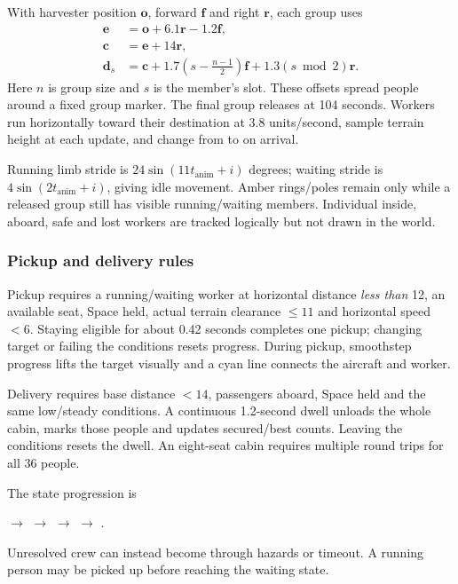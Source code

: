 With harvester position $\mathbf o$, forward $\mathbf f$ and right $\mathbf r$, each group uses
\begin{align}
\mathbf e&=\mathbf o+6.1\mathbf r-1.2\mathbf f,\\
\mathbf c&=\mathbf e+14\mathbf r,\\
\mathbf d_s&=\mathbf c+1.7\left(s-\frac{n-1}{2}\right)\mathbf f+1.3(s\bmod2)\mathbf r.
\end{align}
Here $n$ is group size and $s$ is the member's slot. These offsets spread people around a fixed group marker. The final group releases at 104 seconds. Workers run horizontally toward their destination at 3.8 units/second, sample terrain height at each update, and change from  to  on arrival.

Running limb stride is $24\sin(11t_{\mathrm{anim}}+i)$ degrees; waiting stride is $4\sin(2t_{\mathrm{anim}}+i)$, giving idle movement. Amber rings/poles remain only while a released group still has visible running/waiting members. Individual inside, aboard, safe and lost workers are tracked logically but not drawn in the world.

\subsubsection{Pickup and delivery rules}
Pickup requires a running/waiting worker at horizontal distance \emph{less than} 12, an available seat, Space held, actual terrain clearance $\le11$ and horizontal speed $<6$. Staying eligible for about 0.42 seconds completes one pickup; changing target or failing the conditions resets progress. During pickup, smoothstep progress lifts the target visually and a cyan line connects the aircraft and worker.

Delivery requires base distance $<14$, passengers aboard, Space held and the same low/steady conditions. A continuous 1.2-second dwell unloads the whole cabin, marks those people  and updates secured/best counts. Leaving the conditions resets the dwell. An eight-seat cabin requires multiple round trips for all 36 people.

The state progression is
\begin{center}
 $\longrightarrow$  $\longrightarrow$ 
$\longrightarrow$  $\longrightarrow$ .
\end{center}
Unresolved crew can instead become  through hazards or timeout. A running person may be picked up before reaching the waiting state.

